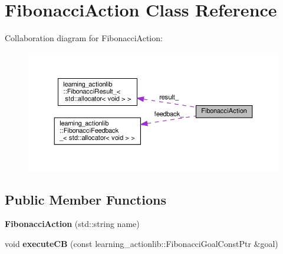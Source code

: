 \hypertarget{classFibonacciAction}{}\section{Fibonacci\+Action Class Reference}
\label{classFibonacciAction}


Collaboration diagram for Fibonacci\+Action\+:
\nopagebreak
\begin{figure}[H]
\begin{center}
\leavevmode
\includegraphics[width=350pt]{classFibonacciAction__coll__graph}
\end{center}
\end{figure}
\subsection*{Public Member Functions}
\begin{DoxyCompactItemize}
\item 
\mbox{\label{classFibonacciAction_a48bacb750276489375d1701a88361005}} 
{\bfseries Fibonacci\+Action} (std\+::string name)
\item 
\mbox{\label{classFibonacciAction_a580d169d7247190cab5c3e30a3fa4eba}} 
void {\bfseries execute\+CB} (const learning\+\_\+actionlib\+::\+Fibonacci\+Goal\+Const\+Ptr \&goal)
\end{DoxyCompactItemize}
